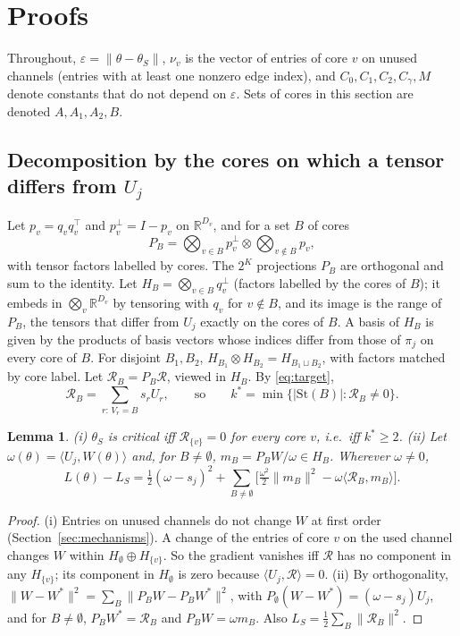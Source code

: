 \documentclass[11pt]{article}
\newtheorem{lemma}{Lemma}
\theoremstyle{definition}
\newcommand{\St}{\mathrm{St}}
\newcommand{\ip}[2]{\langle #1,#2\rangle}
\begin{document}
\section{Proofs}\label{sec:proofs}

Throughout, $\varepsilon=\lVert\theta-\theta_S\rVert$, $\nu_v$ is the vector of entries of core $v$ on unused channels (entries with
at least one nonzero edge index), and $C_0,C_1,C_2,C_\gamma,M$ denote constants that do not depend on $\varepsilon$. Sets of
cores in this section are denoted $A,A_1,A_2,B$.

\subsection{Decomposition by the cores on which a tensor differs from $U_j$}

Let $p_v=q_vq_v^\top$ and $p_v^\perp=I-p_v$ on $\mathbb R^{D_v}$, and for a set $B$ of cores
\[
P_B=\bigotimes_{v\in B}p_v^\perp\otimes\bigotimes_{v\notin B}p_v ,
\]
with tensor factors labelled by cores. The $2^K$ projections $P_B$ are orthogonal and sum to the identity. Let
$H_B=\bigotimes_{v\in B}q_v^\perp$ (factors labelled by the cores of $B$); it embeds in $\bigotimes_v\mathbb R^{D_v}$ by tensoring with
$q_v$ for $v\notin B$, and its image is the range of $P_B$, the tensors that differ from $U_j$ exactly on the cores of $B$.
A basis of $H_B$ is given by the products of basis vectors whose indices differ from those of $\pi_j$ on every core of $B$.
For disjoint $B_1,B_2$, $H_{B_1}\otimes H_{B_2}=H_{B_1\sqcup B_2}$, with factors matched by core label. Let $\mathcal R_B=P_B\mathcal R$,
viewed in $H_B$. By \eqref{eq:target},
\begin{equation}\label{eq:RB}
\mathcal R_B=\sum_{r:\,V_r=B}s_rU_r,\qquad\text{so}\qquad k^*=\min\{\lvert\St(B)\rvert:\mathcal R_B\ne0\}.
\end{equation}

\begin{lemma}\label{lem:decomp}
(i) $\theta_S$ is critical iff $\mathcal R_{\{v\}}=0$ for every core $v$, i.e.\ iff $k^*\ge2$.
(ii) Let $\omega(\theta)=\ip{U_j}{W(\theta)}$ and, for $B\ne\emptyset$, $m_B=P_BW/\omega\in H_B$. Wherever $\omega\ne0$,
\begin{equation}\label{eq:identity}
L(\theta)-L_S=\tfrac12(\omega-s_j)^2+\sum_{B\ne\emptyset}\Big[\tfrac{\omega^2}{2}\lVert m_B\rVert^2-\omega\ip{\mathcal R_B}{m_B}\Big].
\end{equation}
\end{lemma}
\begin{proof}
(i) Entries on unused channels do not change $W$ at first order (Section~\ref{sec:mechanisms}). A change of the entries of
core $v$ on the used channel changes $W$ within $H_\emptyset\oplus H_{\{v\}}$. So the gradient vanishes iff $\mathcal R$ has no
component in any $H_{\{v\}}$; its component in $H_\emptyset$ is zero because $\ip{U_j}{\mathcal R}=0$.
(ii) By orthogonality, $\lVert W-W^*\rVert^2=\sum_B\lVert P_BW-P_BW^*\rVert^2$, with $P_\emptyset(W-W^*)=(\omega-s_j)U_j$, and for
$B\ne\emptyset$, $P_BW^*=\mathcal R_B$ and $P_BW=\omega m_B$. Also $L_S=\frac12\sum_B\lVert\mathcal R_B\rVert^2$.
\end{proof}
\end{document}
